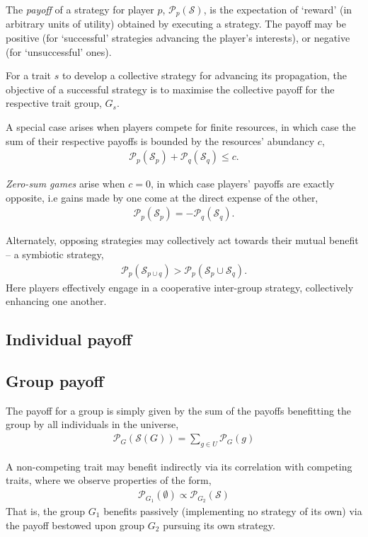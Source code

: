 \documentclass[twocolumn, aps, rmp, amsmath, amssymb, nofootinbib, superscriptaddress, longbibliography, floatfix, table-of-contents, eqsecnum]{revtex4-1}
\begin{document}
The \textit{payoff} of a strategy for player $p$, $\mathcal{P}_p(\mathcal{S})$, is the expectation of `reward' (in arbitrary units of utility) obtained by executing a strategy. The payoff may be positive (for `successful' strategies advancing the player's interests), or negative (for `unsuccessful' ones).

For a trait $s$ to develop a collective strategy for advancing its propagation, the objective of a successful strategy is to maximise the collective payoff for the respective trait group, $G_s$.

A special case arises when players compete for finite resources, in which case the sum of their respective payoffs is bounded by the resources' abundancy $c$,
\begin{align}
	\mathcal{P}_p(\mathcal{S}_p) + \mathcal{P}_q(\mathcal{S}_q) \leq c.
\end{align}

\textit{Zero-sum games} arise when $c=0$, in which case players' payoffs are exactly opposite, i.e gains made by one come at the direct expense of the other,
\begin{align}
\mathcal{P}_p(\mathcal{S}_p) = -\mathcal{P}_q(\mathcal{S}_q).
\end{align}

Alternately, opposing strategies may collectively act towards their mutual benefit -- a symbiotic strategy,
\begin{align}
\mathcal{P}_p(\mathcal{S}_{p\cup q}) > \mathcal{P}_p(\mathcal{S}_p\cup \mathcal{S}_q).
\end{align}
Here players effectively engage in a cooperative inter-group strategy, collectively enhancing one another.

\subsection{Individual payoff}

\subsection{Group payoff}

The payoff for a group is simply given by the sum of the payoffs benefitting the group by all individuals in the universe,
\begin{align}
	\mathcal{P}_{G}(\mathcal{S}(G)) = \sum_{g\in U} \mathcal{P}_G(g)
\end{align}

A non-competing trait may benefit indirectly via its correlation with competing traits, where we observe properties of the form,
\begin{align}
	\mathcal{P}_{G_1}(\emptyset) \propto \mathcal{P}_{G_2}(\mathcal{S})
\end{align}
That is, the group $G_1$ benefits passively (implementing no strategy of its own) via the payoff bestowed upon group $G_2$ pursuing its own strategy.
\end{document}
